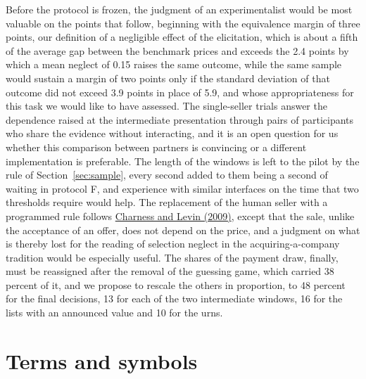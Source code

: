 \documentclass[11pt,a4paper]{article}
\newcommand{\cy}[2]{\hyperlink{cite.#1}{\textcolor{citecolor}{#2}}}
\newcommand{\prot}[1]{\textsf{#1}}
\begin{document}
Before the protocol is frozen, the judgment of an experimentalist would be most valuable on the points that follow, beginning with the equivalence margin of three points, our definition of a negligible effect of the elicitation, which is about a fifth of the average gap between the benchmark prices and exceeds the 2.4 points by which a mean neglect of 0.15 raises the same outcome, while the same sample would sustain a margin of two points only if the standard deviation of that outcome did not exceed 3.9 points in place of 5.9, and whose appropriateness for this task we would like to have assessed. The single-seller trials answer the dependence raised at the intermediate presentation through pairs of participants who share the evidence without interacting, and it is an open question for us whether this comparison between partners is convincing or a different implementation is preferable. The length of the windows is left to the pilot by the rule of Section~\ref{sec:sample}, every second added to them being a second of waiting in protocol \prot{F}, and experience with similar interfaces on the time that two thresholds require would help. The replacement of the human seller with a programmed rule follows \cy{charnesslevin}{Charness and Levin (2009)}, except that the sale, unlike the acceptance of an offer, does not depend on the price, and a judgment on what is thereby lost for the reading of selection neglect in the acquiring-a-company tradition would be especially useful. The shares of the payment draw, finally, must be reassigned after the removal of the guessing game, which carried 38 percent of it, and we propose to rescale the others in proportion, to 48 percent for the final decisions, 13 for each of the two intermediate windows, 16 for the lists with an announced value and 10 for the urns.

\clearpage
\appendix

\section{Terms and symbols}\label{sec:terms}
\end{document}
